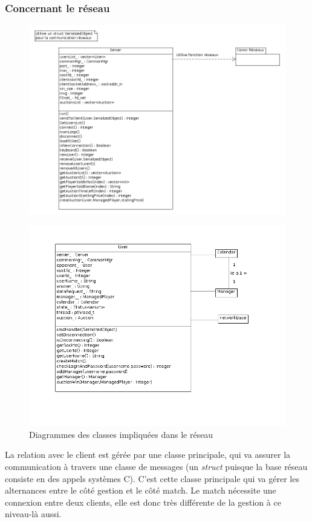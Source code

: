 \documentclass[a4paper,titlepage]{scrreprt}
\begin{document}
  \subsubsection{Concernant le réseau}
    \begin{figure}[H]
    \center
    \includegraphics[scale=0.5]{uml/class/Server.png}
    \end{figure}	
    \begin{figure}[H]
    \center
    \includegraphics[scale=0.5]{uml/class/User.png}
    \caption{Diagrammes des classes impliquées dans le réseau}
    \end{figure}
    La relation avec le client est gérée par une classe principale, qui va assurer la communication
    à travers une classe de messages (un \emph{struct} puisque la base réseau consiste en des appels systèmes C).
    C'est cette classe principale qui va gérer les alternances entre le côté gestion et le côté match. Le match nécessite une connexion entre deux clients, elle est donc très différente de la gestion
    à ce niveau-là aussi.
\end{document}
